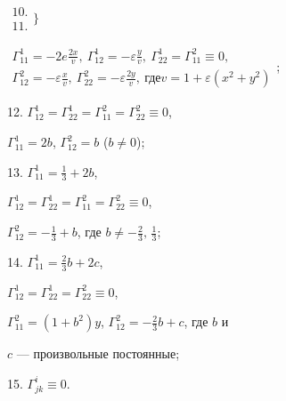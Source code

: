 \smallskip





\hspace{-1.6mm}$\begin{array}{l} 10.\\ 11.\end{array}\bigg\}$ 


$\begin{array}{l}\Gamma^1_{11}=-2e\frac{2x}{v}, 


\ \Gamma^1_{12}=-\varepsilon\frac{y}{v}, 


\ \Gamma^1_{22}=\Gamma^2_{11}\equiv0, \\


\Gamma^2_{12}=-\varepsilon\frac{x}{v}, 


\ \Gamma^2_{22}=-\varepsilon\frac{2y}{v},\ \text{где}


v=1+\varepsilon(x^2+y^2)\end{array}$; 


\smallskip


 


12. $\Gamma^1_{12}=\Gamma^1_{22}=\Gamma^2_{11}=\Gamma^2_{22}\equiv0$, 


$\Gamma^1_{11}=2b$, $\Gamma^2_{12}=b$ ($b\ne0$); 


\smallskip


 


13. $\Gamma^1_{11}=\frac{1}{3}+2b$, 


$\Gamma^1_{12}=\Gamma^1_{22}=\Gamma^2_{11}=\Gamma^2_{22}\equiv0$, 


$\Gamma^2_{12}=-\frac{1}{3}+b$, где $b\ne-\frac{2}{3},\,\frac{1}{3}$; 


\smallskip


 


14. $\Gamma^1_{11}=\frac{2}{3}b+2c$, 


$\Gamma^1_{12}=\Gamma^1_{22}=\Gamma^2_{22}\equiv0$, 


$\Gamma^2_{11}=(1+b^2)y$, $\Gamma^2_{12}=-\frac{2}{3}b+c$, где $b$ и 


$c$ --- произвольные постоянные; 


\smallskip


 


15. $\Gamma^i_{jk}\equiv0$. 


 


